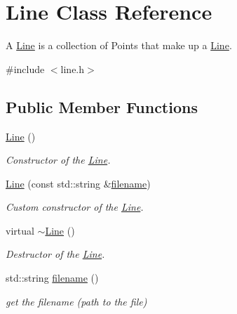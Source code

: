 \hypertarget{class_line}{}\section{Line Class Reference}
\label{class_line}


A \hyperlink{class_line}{Line} is a collection of Points that make up a \hyperlink{class_line}{Line}.  




{\ttfamily \#include $<$line.\+h$>$}

\subsection*{Public Member Functions}
\begin{DoxyCompactItemize}
\item 
\mbox{\label{class_line_acc11b8a429d8cdd63ba6803dff5602b3}} 
\hyperlink{class_line_acc11b8a429d8cdd63ba6803dff5602b3}{Line} ()
\begin{DoxyCompactList}\small\item\em Constructor of the \hyperlink{class_line}{Line}. \end{DoxyCompactList}\item 
\mbox{\label{class_line_a287078161d098c58ee4267a617ec38c2}} 
\hyperlink{class_line_a287078161d098c58ee4267a617ec38c2}{Line} (const std\+::string \&\hyperlink{class_line_acc3089fd3ae6139e8900090bed9f5c4d}{filename})
\begin{DoxyCompactList}\small\item\em Custom constructor of the \hyperlink{class_line}{Line}. \end{DoxyCompactList}\item 
\mbox{\label{class_line_aabe85f48d22d92b62257091f48174fac}} 
virtual \hyperlink{class_line_aabe85f48d22d92b62257091f48174fac}{$\sim$\+Line} ()
\begin{DoxyCompactList}\small\item\em Destructor of the \hyperlink{class_line}{Line}. \end{DoxyCompactList}\item 
std\+::string \hyperlink{class_line_acc3089fd3ae6139e8900090bed9f5c4d}{filename} ()
\begin{DoxyCompactList}\small\item\em get the filename (path to the file) \end{DoxyCompactList}\item 

\end{DoxyCompactItemize}
